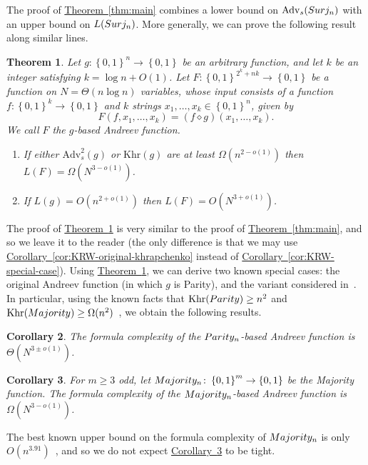 \documentclass[11pt]{article}
\numberwithin{equation}{section}
\newtheorem{theorem}{Theorem}[section]
\newtheorem{corollary}[theorem]{Corollary}
\theoremstyle{definition}
\theoremstyle{plain}
\newcommand{\expref}[2]{\hyperref[#2]{#1~\ref{#2}}}
\theoremstyle{definition}\newtheorem{notation}[theorem]{Notation}\theoremstyle{plain}
\newcommand{\B}{\left\{ 0,1 \right \}}
\newcommand{\surj}{\textup{\textsf{Surj}}}
\newcommand{\parity}{\textup{\textsf{Parity}}}
\newcommand{\majority}{\textup{\textsf{Majority}}}
\newcommand{\K}{\mathrm{Khr}}
\newcommand{\Am}{\mathrm{Adv}_{s}}
\renewcommand{\d}{\diamond}
\theoremstyle{definition}
\theoremstyle{plain}
\begin{document}
The proof of \expref{Theorem}{thm:main} combines a lower bound on $\Am(\surj_{n})$
with an upper bound on $L(\surj_{n})$. More generally, we can prove
the following result along similar lines. 
\begin{theorem}
\label{thm:andreev-general}Let $g\colon\B^{n}\to\B$ be an arbitrary
function, and let $k$ be an integer satisfying $k=\log n+O(1)$.
Let $F\colon\B^{2^{k}+nk}\to\B$ be a function on $N=\Theta(n\log n)$
variables, whose input consists of a function $f\colon\B^{k}\to\B$
and $k$ strings $x_{1},\ldots,x_{k}\in\B^{n}$, given by 
\[
F(f,x_{1},\ldots,x_{k})=(f\d g)(x_{1},\ldots,x_{k}).
\]
We call $F$ the \emph{$g$-based Andreev function.} 
\begin{enumerate}
\item If either $\Am^{2}(g)$ or $\K(g)$ are at least $\Omega(n^{2-o(1)})$
then $L(F)=\Omega(N^{3-o(1)})$. 
\item If $L(g)=O(n^{2+o(1)})$ then $L(F)=O(N^{3+o(1)})$. 
\end{enumerate}
\end{theorem}

The proof of \expref{Theorem}{thm:andreev-general} is very similar to the proof
of \expref{Theorem}{thm:main}, and so we leave it to the reader (the only difference
is that we may use \expref{Corollary}{cor:KRW-original-khrapchenko} instead of \expref{Corollary}{cor:KRW-special-case}).
Using \expref{Theorem}{thm:andreev-general}, we can derive two known special
cases: the original Andreev function (in which $g$ is Parity), and
the variant considered in~\cite{GTN19}. In particular, using the
known facts that $\K(\parity)\ge n^{2}$ and $\K(\majority)\ge\Omega(n^{2})$~\cite{K72},
we obtain the following results. 
\begin{corollary}
\label{cor:parity}The formula complexity of the $\parity_{n}$-based
Andreev function is $\Theta(N^{3\pm o(1)})$. 
\end{corollary}

\begin{corollary}
\label{cor:majority} For $m\geq3$ odd, let $\majority_{n}\colon\B^{m}\to\B$
be the Majority function. The formula complexity of the $\majority_{n}$-based
Andreev function is $\Omega(N^{3-o(1)})$. 
\end{corollary}

The best known upper bound on the formula complexity of $\majority_{n}$
is only $O(n^{3.91})$~\cite{S16}, and so we do not expect 
\expref{Corollary}{cor:majority} to be tight.

%
\end{document}
